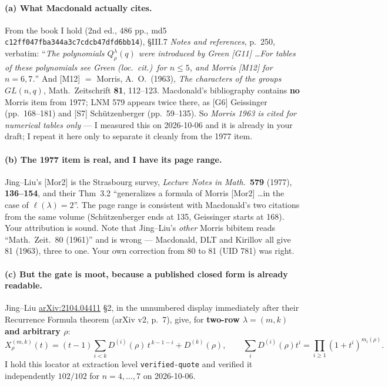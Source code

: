 \documentclass[11pt]{article}
\theoremstyle{plain}
\theoremstyle{definition}
\newcommand{\lam}{\lambda}
\begin{document}
\paragraph{(a) What Macdonald actually cites.} From the book I hold (2nd ed., 486 pp., md5
\texttt{c12ff047fba344a3c7cdcb47dfd6bb14}), \S III.7 \emph{Notes and references}, p.~250, verbatim:
``\emph{The polynomials $Q^\lam_\rho(q)$ were introduced by Green [G11] \dots For tables of these
polynomials see Green (loc.\ cit.)\ for $n\le5$, and Morris [M12] for $n=6,7$.}'' And
[M12] $=$ Morris, A.~O.\ (1963), \emph{The characters of the groups $GL(n,q)$}, Math.\ Zeitschrift
\textbf{81}, 112--123. Macdonald's bibliography contains \textbf{no} Morris item from 1977; LNM 579
appears twice there, as [G6] Geissinger (pp.~168--181) and [S7] Sch\"utzenberger (pp.~59--135).
So \emph{Morris 1963 is cited for numerical tables only} --- I measured this on 2026-10-06 and it
is already in your draft; I repeat it here only to separate it cleanly from the 1977 item.

\paragraph{(b) The 1977 item is real, and I have its page range.} Jing--Liu's [Mor2] is the
Strasbourg survey, \emph{Lecture Notes in Math.}\ \textbf{579} (1977), \textbf{136--154}, and their
Thm~3.2 ``generalizes a formula of Morris [Mor2] \dots in the case of $\ell(\lam)=2$''. The page
range is consistent with Macdonald's two citations from the same volume (Sch\"utzenberger ends at
135, Geissinger starts at 168). Your attribution is sound. Note that Jing--Liu's \emph{other}
Morris bibitem reads ``Math.\ Zeit.\ 80 (1961)'' and is wrong --- Macdonald, DLT and Kirillov all
give 81 (1963), three to one. Your own correction from 80 to 81 (UID 781) was right.

\paragraph{(c) But the gate is moot, because a published closed form is already readable.}
Jing--Liu \href{https://arxiv.org/abs/2104.04411}{arXiv:2104.04411} §2, in the unnumbered display
immediately after their Recurrence Formula theorem (arXiv v2, p.~7), give, for \textbf{two-row
$\lam=(m,k)$ and arbitrary $\rho$}:
\[
X^{(m,k)}_\rho(t)=(t-1)\sum_{i<k}D^{(i)}(\rho)\,t^{\,k-1-i}+D^{(k)}(\rho),
\qquad \sum_i D^{(i)}(\rho)t^i=\prod_{i\ge1}(1+t^i)^{m_i(\rho)}.
\]
I hold this locator at extraction level \texttt{verified-quote} and verified it independently
$102/102$ for $n=4,\dots,7$ on 2026-10-06.
\end{document}
